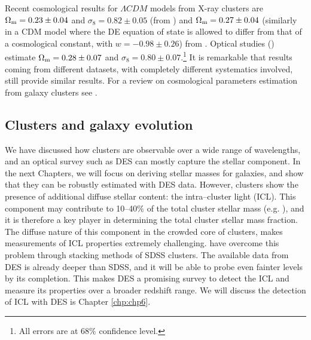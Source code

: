 Recent cosmological results for $\Lambda CDM$ models from X-ray clusters are $\Omega_{\rm m}=0.23\pm 0.04$ and $\sigma_8=0.82\pm0.05$ (from \citealt{2010MNRAS.406.1759M}) and $\Omega_{\rm m}=0.27\pm 0.04$ (similarly in a CDM model where the DE equation of state is allowed to differ from that of a cosmological constant, with $w=-0.98\pm0.26$) from \citet{2014MNRAS.440.2077M}. Optical studies (\citealt{rozo2010}) estimate $\Omega_{\rm m}=0.28\pm 0.07$ and $\sigma_8=0.80\pm0.07$.\footnote{All errors are at $68\%$ confidence level.} It is remarkable that results coming from different datasets, with completely different systematics involved, still provide similar results. For a review on cosmological parameters estimation from galaxy clusters see \citet{allen}.

\subsection{Clusters and galaxy evolution}

We have discussed how clusters are observable over a wide range of wavelengths, and an optical survey such as DES can mostly capture the stellar component. In the next Chapters, we will focus on deriving stellar masses for galaxies, and show that they can be robustly estimated with DES data. However, clusters show the presence of additional diffuse stellar content: the intra--cluster light (ICL). This component may contribute to 10--40\% of the total cluster stellar mass (e.g. \citealt{2005MNRAS.358..949Z,2005ApJ...618..195G}), and it is therefore a key player in determining the total cluster stellar mass fraction. The diffuse nature of this component in the crowded core of clusters, makes measurements of ICL properties extremely challenging. \citet{2005MNRAS.358..949Z} have overcome this problem through stacking methods of SDSS clusters. The available data from DES is already deeper than SDSS, and it will be able to probe even fainter levels by its completion. This makes DES a promising survey to detect the ICL and measure its properties over a broader redshift range. We will discuss the detection of ICL with DES is Chapter \ref{chp:chp6}.

